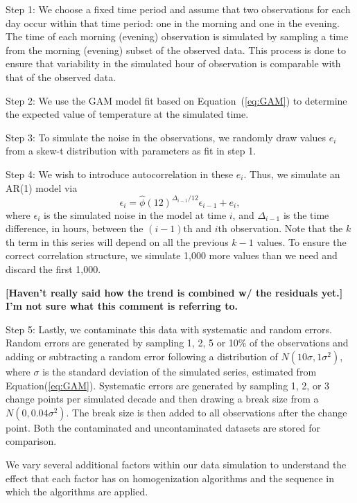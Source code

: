 \documentclass[12pt]{article}
\begin{document}
\begin{doublespacing}
Step 1: We choose a fixed time period and assume that two observations for each day occur within that time period: one in the morning and one in the evening.  The time of each morning (evening) observation is simulated by sampling a time from the morning (evening) subset of the observed data.  This process is done to ensure that variability in the simulated hour of observation is comparable with that of the observed data.

Step 2: We use the GAM model fit based on Equation~(\ref{eq:GAM}) to determine the expected value of temperature at the simulated time.

Step 3: To simulate the noise in the observations, we randomly draw values $e_i$ from a skew-t distribution with parameters as fit in step 1.

Step 4: We wish to introduce autocorrelation in these $e_i$.  Thus, we simulate an AR(1) model via
\begin{equation*}
	\epsilon_i = \widehat{\phi}(12)^{\Delta_{i-1}/12} \epsilon_{i-1} + e_i,
\end{equation*}
where $\epsilon_i$ is the simulated noise in the model at time $i$, and $\Delta_{i-1}$ is the time difference, in hours, between the $(i-1)$th and $i$th observation.  Note that the $k$th term in this series will depend on all the previous $k-1$ values.  To ensure the correct correlation structure, we simulate 1,000 more values than we need and discard the first 1,000.

\textbf{[Haven't really said how the trend is combined w/ the residuals yet.]  I'm not sure what this comment is referring to.}

Step 5: Lastly, we contaminate this data with systematic and random errors.  Random errors are generated by sampling 1, 2, 5 or 10\% of the observations and adding or subtracting a random error following a distribution of $N(10\sigma,1\sigma^2)$, where $\sigma$ is the standard deviation of the simulated series, estimated from Equation(\ref{eq:GAM}).  Systematic errors are generated by sampling 1, 2, or 3 change points per simulated decade and then drawing a break size from a $N(0,0.04 \sigma^2)$.  The break size is then added to all observations after the change point.  Both the contaminated and uncontaminated datasets are stored for comparison.

We vary several additional factors within our data simulation to understand the effect that each factor has on homogenization algorithms and the sequence in which the algorithms are applied.


\end{doublespacing}
\end{document}
